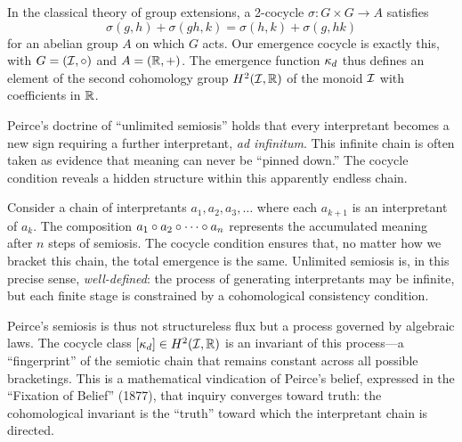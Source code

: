 \begin{remark}
In the classical theory of group extensions, a 2-cocycle
$\sigma : G \times G \to A$ satisfies
\[
    \sigma(g, h) + \sigma(gh, k) = \sigma(h, k) + \sigma(g, hk)
\]
for an abelian group $A$ on which $G$ acts. Our emergence cocycle is
exactly this, with $G = (\mathcal{I}, \circ)$ and $A = (\mathbb{R}, +)$. The
emergence function $\kappa_d$ thus defines an element of the second
cohomology group $H^2(\mathcal{I}, \mathbb{R})$ of the monoid $\mathcal{I}$ with coefficients
in $\mathbb{R}$.
\end{remark}

\begin{interpretation}\label{interp:ch2:peirce_unlimited_semiosis}
Peirce's doctrine of ``unlimited semiosis'' holds that every interpretant
becomes a new sign requiring a further interpretant, \emph{ad infinitum}.
This infinite chain is often taken as evidence that meaning can never be
``pinned down.'' The cocycle condition reveals a hidden structure within
this apparently endless chain.

Consider a chain of interpretants $a_1, a_2, a_3, \ldots$ where each
$a_{k+1}$ is an interpretant of $a_k$. The composition $a_1 \circ
a_2 \circ \cdots \circ a_n$ represents the accumulated meaning
after $n$ steps of semiosis. The cocycle condition ensures that, no
matter how we bracket this chain, the total emergence is the same.
Unlimited semiosis is, in this precise sense, \emph{well-defined}: the
process of generating interpretants may be infinite, but each finite
stage is constrained by a cohomological consistency condition.

Peirce's semiosis is thus not structureless flux but a process governed
by algebraic laws. The cocycle class $[\kappa_d] \in H^2(\mathcal{I}, \mathbb{R})$
is an invariant of this process---a ``fingerprint'' of the semiotic chain
that remains constant across all possible bracketings. This is a
mathematical vindication of Peirce's belief, expressed in the
``Fixation of Belief'' (1877), that inquiry converges toward truth:
the cohomological invariant is the ``truth'' toward which the
interpretant chain is directed.
\end{interpretation}

